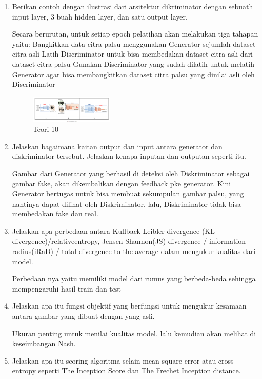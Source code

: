 \begin{enumerate}
	\item Berikan contoh dengan ilustrasi dari arsitektur dikriminator dengan sebuath input layer, 3 buah hidden layer, dan satu output layer.
	\hfill\break

	 Secara berurutan, untuk setiap epoch pelatihan akan melakukan tiga tahapan yaitu:
    Bangkitkan data citra palsu menggunakan Generator sejumlah dataset citra asli
    Latih Discriminator untuk bisa membedakan dataset citra asli dari dataset citra palsu
    Gunakan Discriminator yang sudah dilatih untuk melatih Generator agar bisa membangkitkan dataset citra palsu yang dinilai asli oleh Discriminator

	\begin{figure}[H]
	\centering
		\includegraphics[width=4cm]{figures/1174012/chapter8/T10.PNG}
		\caption{Teori 10}
	\end{figure}

	\item Jelaskan bagaimana kaitan output dan input antara generator dan diskriminator tersebut. Jelaskan kenapa inputan dan outputan seperti itu.
	\hfill\break

	Gambar dari Generator yang berhasil di deteksi oleh Diskriminator sebagai gambar fake, akan dikembalikan dengan feedback pke generator. Kini Generator bertugas untuk bisa membuat sekumpulan gambar palsu, yang nantinya dapat dilihat oleh Diskriminator, lalu, Diskriminator tidak bisa membedakan fake dan real.

	\item Jelaskan apa perbedaan antara Kullback-Leibler divergence (KL divergence)/relativeentropy, Jensen-Shannon(JS) divergence / information radius(iRaD) / total divergence to the average dalam mengukur kualitas dari model.
	\hfill\break

	Perbedaan nya yaitu memiliki model dari rumus yang berbeda-beda sehingga mempengaruhi hasil train dan test

	\item Jelaskan apa itu fungsi objektif yang berfungsi untuk mengukur kesamaan antara gambar yang dibuat dengan yang asli.
	\hfill\break

	Ukuran penting untuk menilai kualitas model. lalu kemudian akan melihat di keseimbangan Nash.

	\item Jelaskan apa itu scoring algoritma selain mean square error atau cross entropy seperti The Inception Score dan The Frechet Inception distance.
	\hfill\break


\end{enumerate}
